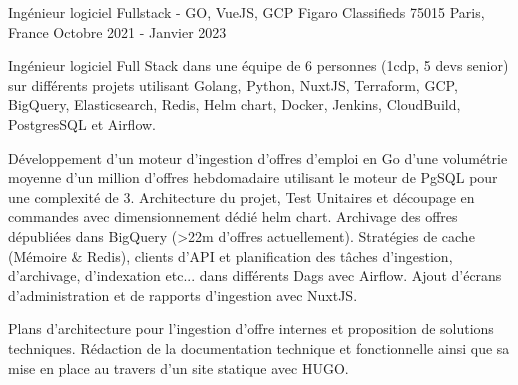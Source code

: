 \cventry
{Ingénieur logiciel Fullstack - GO, VueJS, GCP} %
{Figaro Classifieds} %
{75015 Paris, France} %
{Octobre 2021 - Janvier 2023} %
{
    \begin{cvitems} %
        \item
        {
            Ingénieur logiciel Full Stack dans une équipe de 6 personnes (1cdp, 5 devs senior) sur différents projets
            utilisant Golang, Python, NuxtJS, Terraform, GCP, BigQuery, Elasticsearch, Redis, Helm chart, Docker, Jenkins,
            CloudBuild, PostgresSQL et Airflow.
        }
        \item
        {
            Développement d'un moteur d'ingestion d'offres d'emploi en Go d'une volumétrie moyenne d'un million d'offres
            hebdomadaire utilisant le moteur de PgSQL pour une complexité de 3. Architecture du projet, Test Unitaires et
            découpage en commandes avec dimensionnement dédié helm chart. Archivage des offres dépubliées dans BigQuery
            (>22m d'offres actuellement). Stratégies de cache (Mémoire \& Redis), clients d'API et planification
            des tâches d'ingestion, d'archivage, d'indexation etc... dans différents Dags avec Airflow.
            Ajout d'écrans d'administration et de rapports d'ingestion avec NuxtJS.
        }
        \item
        {
            Plans d'architecture pour l'ingestion d'offre internes et proposition de solutions techniques. Rédaction de
            la documentation technique et fonctionnelle ainsi que sa mise en place au travers d'un site statique avec HUGO.
        }
    \end{cvitems}
}

